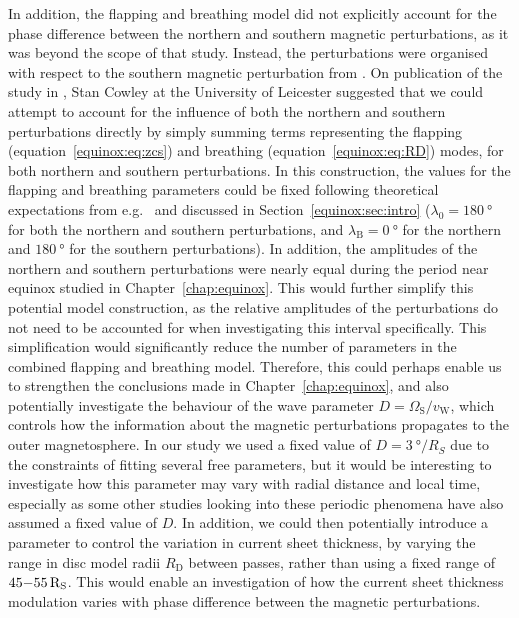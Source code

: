 In addition, the flapping and breathing  model did not explicitly account for the phase difference between the northern and southern magnetic perturbations, as it was beyond the scope of that study. Instead, the perturbations were organised with  respect to the southern magnetic perturbation from \citet{andrews2012}. On publication of the study in \citet{sorba2018}, Stan Cowley at the University of Leicester suggested that we could attempt to account for the influence of both the northern and southern perturbations directly by simply summing terms representing the flapping (equation~\ref{equinox:eq:zcs}) and breathing (equation~\ref{equinox:eq:RD}) modes, for both northern and southern perturbations. In this construction, the values for the flapping and breathing parameters could be fixed following theoretical expectations from e.g.\ \citet{cowley2017a} and discussed in Section~\ref{equinox:sec:intro} ($\lambda_0 = \SI{180}{\degree}$ for both the northern and southern perturbations, and $\lambda_\mathrm{B}=\SI{0}{\degree}$ for the northern and $\SI{180}{\degree}$ for the southern perturbations). In addition, the amplitudes of the northern and southern perturbations were nearly equal during the period near equinox studied in Chapter~\ref{chap:equinox}. This would further simplify this potential model construction, as the relative amplitudes of the perturbations do not need to be accounted for when investigating this interval specifically. This simplification would significantly reduce the number of parameters in the combined flapping and breathing model. Therefore, this could perhaps enable us to strengthen the conclusions made in Chapter~\ref{chap:equinox}, and also potentially investigate the behaviour of the wave parameter $D=\Omega_\mathrm{S}/v_\mathrm{W}$, which controls how the information about the magnetic perturbations propagates to the outer magnetosphere. In our study we used a fixed value of $D=\SI{3}{\degree \per R_S}$ due to the constraints of fitting several free parameters, but it would be interesting to investigate how this parameter may vary with radial distance and local time, especially as some other studies looking into these periodic phenomena have also assumed a fixed value of $D$. In addition, we could then potentially introduce a parameter to control the variation in current sheet thickness, by varying the range in disc model radii $R_\mathrm{D}$ between passes, rather than using a fixed range of $45{\--}\SI{55}{R_S}$. This would enable an investigation of how the current sheet thickness modulation varies with phase difference between the magnetic perturbations.

